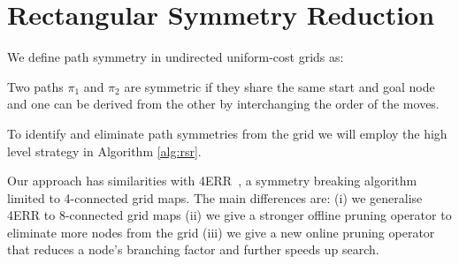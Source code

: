 \section{Rectangular Symmetry Reduction}
\label{sec:rsr}

We define path symmetry in undirected uniform-cost grids as:
\begin{definition}
\label{def:symmetry}
Two paths $\pi_{1}$ and $\pi_{2}$ are symmetric if they share the same start and
goal node and one can be derived from the other by interchanging the order of the
moves.
\end{definition}

To identify and eliminate path symmetries from the grid we will employ the high 
level strategy in Algorithm \ref{alg:rsr}.



Our approach has similarities with 4ERR~\cite{harabor10}, a symmetry breaking algorithm 
limited to 4-connected grid maps.
The main differences are: (i) we generalise 4ERR to 8-connected grid maps 
(ii) we give a stronger offline pruning operator to eliminate more nodes from
the grid (iii) we give a new online pruning operator that reduces a node's branching
factor and further speeds up search.

